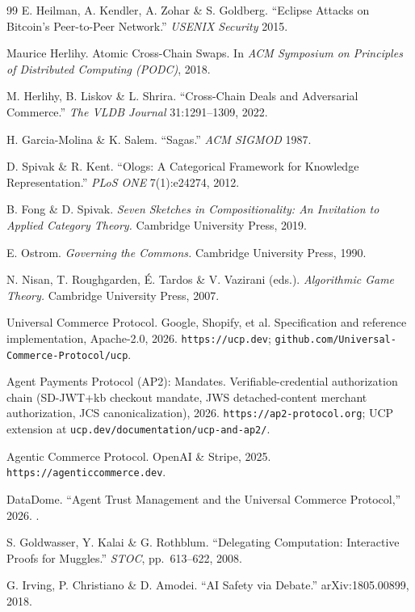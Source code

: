 \documentclass[11pt,a4paper]{article}
\theoremstyle{definition}
\theoremstyle{definition}
\theoremstyle{remark}
\begin{document}
\begin{thebibliography}{99}
 E. Heilman, A. Kendler, A. Zohar \& S. Goldberg. ``Eclipse
Attacks on Bitcoin's Peer-to-Peer Network.'' \emph{USENIX Security} 2015.

Maurice Herlihy.
\newblock Atomic Cross-Chain Swaps.
\newblock In \textit{ACM Symposium on Principles of Distributed Computing (PODC)}, 2018.

 M. Herlihy, B. Liskov \& L. Shrira. ``Cross-Chain Deals and
Adversarial Commerce.'' \emph{The VLDB Journal} 31:1291--1309, 2022.

 H. Garcia-Molina \& K. Salem. ``Sagas.'' \emph{ACM SIGMOD} 1987.

 D. Spivak \& R. Kent. ``Ologs: A Categorical Framework for
Knowledge Representation.'' \emph{PLoS ONE} 7(1):e24274, 2012.

 B. Fong \& D. Spivak. \emph{Seven Sketches in Compositionality:
An Invitation to Applied Category Theory.} Cambridge University Press, 2019.

 E. Ostrom. \emph{Governing the Commons.} Cambridge University
Press, 1990.

 N. Nisan, T. Roughgarden, É. Tardos \& V. Vazirani (eds.).
\emph{Algorithmic Game Theory.} Cambridge University Press, 2007.

 Universal Commerce Protocol. Google, Shopify, et al.
Specification and reference implementation, Apache-2.0, 2026.
\texttt{https://ucp.dev}; \texttt{github.com/Universal-Commerce-Protocol/ucp}.

 Agent Payments Protocol (AP2): Mandates.
Verifiable-credential authorization chain (SD-JWT+kb checkout mandate, JWS
detached-content merchant authorization, JCS canonicalization), 2026.
\texttt{https://ap2-protocol.org}; UCP extension at
\texttt{ucp.dev/documentation/ucp-and-ap2/}.

 Agentic Commerce Protocol. OpenAI \& Stripe, 2025.
\texttt{https://agenticcommerce.dev}.

 DataDome. ``Agent Trust Management and the Universal
Commerce Protocol,'' 2026.
.

 S. Goldwasser, Y. Kalai \& G. Rothblum. ``Delegating
Computation: Interactive Proofs for Muggles.'' \emph{STOC}, pp.~613--622, 2008.

 G. Irving, P. Christiano \& D. Amodei. ``AI Safety via
Debate.'' arXiv:1805.00899, 2018.


\end{thebibliography}
\end{document}

